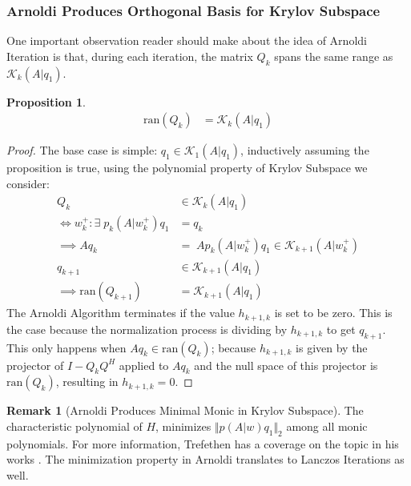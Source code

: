 \documentclass[]{article}
\theoremstyle{definition}
\newtheorem{prop}{Proposition}[section]  %
\newtheorem{remark}{Remark}[subsection]  %
\begin{document}
        \subsubsection{Arnoldi Produces Orthogonal Basis for Krylov Subspace}
            One important observation reader should make about the idea of Arnoldi Iteration is that, during each iteration, the matrix $Q_k$ spans the same range as $\mathcal K_k(A|q_1)$. 
            \begin{prop}
                \begin{align}
                    \text{ran}(Q_k) &= \mathcal K_k(A|q_1)
                \end{align}
            \end{prop}
            \begin{proof}
                The base case is simple: $q_1 \in \mathcal K_1(A|q_1)$, inductively assuming the proposition is true, using the polynomial property of Krylov Subspace we consider: 
                $$
                \begin{aligned}
                    Q_k &\in \mathcal K_k(A|q_1)
                    \\
                    \iff w_k^+: \exists\; p_k(A|w_k^+)q_1 &= q_k
                    \\
                    \implies Aq_k &= \; Ap_k(A|w_k^+)q_1 \in \mathcal K_{k + 1}(A|w_k^+)
                    \\
                    q_{k + 1} &\in \mathcal K_{k + 1}(A|q_{1})
                    \\
                    \implies \text{ran}(Q_{k + 1}) &= \mathcal K_{k + 1}(A|q_1)
                \end{aligned}
                $$
                The Arnoldi Algorithm terminates if the value $h_{k + 1, k}$ is set to be zero. This is the case because the normalization process is dividing by $h_{k + 1, k}$ to get $q_{k + 1}$. This only happens when $Aq_{k}\in \text{ran}(Q_k)$; because $h_{k +1, k}$ is given by the projector of $I - Q_kQ^H$ applied to $Aq_k$ and the null space of this projector is $\text{ran}(Q_k)$, resulting in $h_{k + 1, k} = 0$. 
            \end{proof}
            \begin{remark}[Arnoldi Produces Minimal Monic in Krylov Subspace]\label{remark:Arnoldi_Produces_Minimal_Monic_in_Krylov_Subspace}
                The characteristic polynomial of $H$, minimizes $\Vert p(A|w)q_1\Vert_2$ among all monic polynomials. For more information, Trefethen has a coverage on the topic in his works \cite{book:trefethen}. The minimization property in Arnoldi translates to Lanczos Iterations as well. 
            \end{remark}
\end{document}
